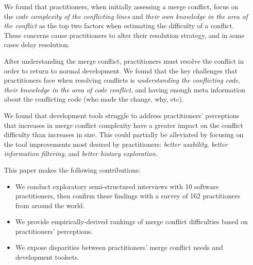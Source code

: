 We found that practitioners, when initially assessing a merge conflict, focus on the \textit{code complexity of the conflicting lines} and \textit{their own knowledge in the area of the conflict} as the top two factors when estimating the difficulty of a conflict. These concerns cause practitioners to alter their resolution strategy, and in some cases delay resolution.

After understanding the merge conflict, practitioners must resolve the conflict in order to return to normal development.
We found that the key challenges that practitioners face when resolving conflicts is \textit{understanding the conflicting code}, \textit{their knowledge in the area of code conflict}, and having enough meta information about the conflicting code (who made the change, why, etc).

We found that development tools struggle to address practitioners' perceptions that increases in merge conflict complexity have a greater impact on the conflict difficulty  than increases in size.
This could partially be alleviated by focusing on the tool improvements most desired by practitioners: \textit{better usability}, \textit{better information filtering}, and \textit{better history exploration}.


This paper makes the following contributions:
\begin{itemize}
\item We conduct exploratory semi-structured interviews with 10 software practitioners, then confirm these findings with a survey of 162 practitioners from around the world.
\item We provide empirically-derived rankings of merge conflict difficulties based on practitioners' perceptions.
\item We expose disparities between practitioners' merge conflict needs and development toolsets.
\end{itemize}